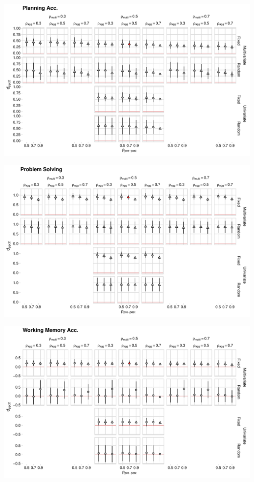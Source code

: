 \documentclass[
]{article}
\begin{document}
\begin{landscape}
\begin{center}\includegraphics[width=648px]{supplementary_files/figure-latex/planning-accuracy-plot-1} \end{center}


\begin{center}\includegraphics[width=648px]{supplementary_files/figure-latex/problem-solving-plot-1} \end{center}


\begin{center}\includegraphics[width=648px]{supplementary_files/figure-latex/working-memory-accuracy-plot-1} \end{center}

\end{landscape}
\end{document}
